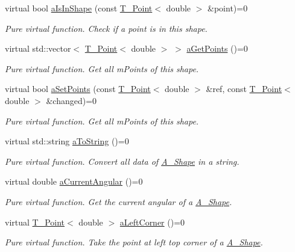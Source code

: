 \begin{DoxyCompactItemize}
virtual bool \hyperlink{classA__Shape_a63f825cbc9780208d9a137f5c14917d0}{a\+Is\+In\+Shape} (const \hyperlink{classT__Point}{T\+\_\+\+Point}$<$ double $>$ \&point)=0
\begin{DoxyCompactList}\small\item\em Pure virtual function. Check if a point is in this shape. \end{DoxyCompactList}\item 
virtual std\+::vector$<$ \hyperlink{classT__Point}{T\+\_\+\+Point}$<$ double $>$ $>$ \hyperlink{classA__Shape_a9fd1285bd63b1fc88943c9969bf01a5c}{a\+Get\+Points} ()=0
\begin{DoxyCompactList}\small\item\em Pure virtual function. Get all m\+Points of this shape. \end{DoxyCompactList}\item 
virtual bool \hyperlink{classA__Shape_a6996f454b337f8425ad13cba3f7a7c35}{a\+Set\+Points} (const \hyperlink{classT__Point}{T\+\_\+\+Point}$<$ double $>$ \&ref, const \hyperlink{classT__Point}{T\+\_\+\+Point}$<$ double $>$ \&changed)=0
\begin{DoxyCompactList}\small\item\em Pure virtual function. Get all m\+Points of this shape. \end{DoxyCompactList}\item 
virtual std\+::string \hyperlink{classA__Shape_ad8804b4e74543db374af6892367b7c2e}{a\+To\+String} ()=0
\begin{DoxyCompactList}\small\item\em Pure virtual function. Convert all data of \hyperlink{classA__Shape}{A\+\_\+\+Shape} in a string. \end{DoxyCompactList}\item 
virtual double \hyperlink{classA__Shape_a80fa4e009c875dd0ba7fc5bfeeb43f98}{a\+Current\+Angular} ()=0
\begin{DoxyCompactList}\small\item\em Pure virtual function. Get the current angular of a \hyperlink{classA__Shape}{A\+\_\+\+Shape}. \end{DoxyCompactList}\item 
virtual \hyperlink{classT__Point}{T\+\_\+\+Point}$<$ double $>$ \hyperlink{classA__Shape_abe6781b13037bf7ecea8ff9456b31533}{a\+Left\+Corner} ()=0
\begin{DoxyCompactList}\small\item\em Pure virtual function. Take the point at left top corner of a \hyperlink{classA__Shape}{A\+\_\+\+Shape}. \end{DoxyCompactList}\item 

\end{DoxyCompactItemize}
